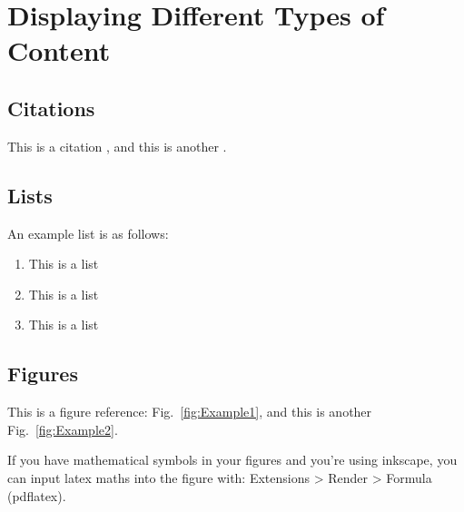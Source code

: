 \documentclass[preprint,3p,11pt,sort]{elsarticle}
\newcommand{\figref}[1]{Fig.~\ref{#1}}
\begin{document}
\section{Displaying Different Types of Content} \label{sec:ContentTypes}


\subsection{Citations}
This is a citation \cite{example1}, and this is another \cite{example1,example2,example4,example5}.


\subsection{Lists}
An example list is as follows:

\begin{enumerate}
    \item This is a list
    \item This is a list
    \item This is a list
\end{enumerate}


\subsection{Figures}
This is a figure reference: \figref{fig:Example1}, and this is another \figref{fig:Example2}.

If you have mathematical symbols in your figures and you're using inkscape, you can input latex maths into the figure with: Extensions > Render > Formula (pdflatex).
\end{document}
